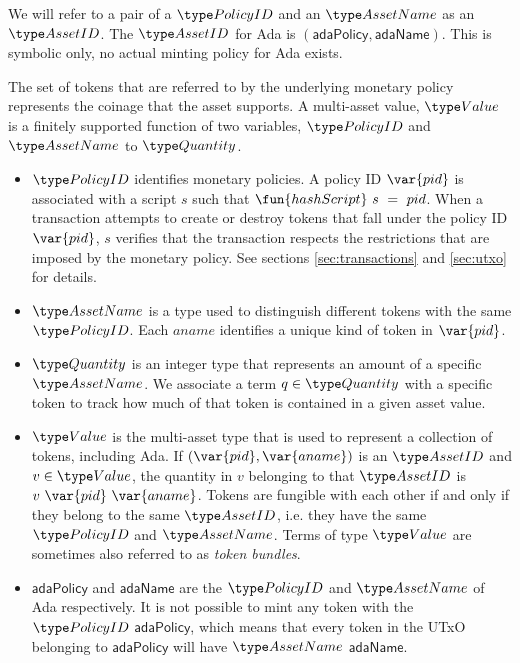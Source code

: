 We will refer to a pair of a $\PolicyID$ and an
$\AssetName$ as an $\AssetID$. The $\AssetID$ for Ada is $(\mathsf{adaPolicy}, \mathsf{adaName})$.
This is symbolic only, no actual minting policy for Ada exists.

The set of tokens that are referred to by the underlying monetary
policy represents the coinage that the asset supports. A multi-asset
value, $\Value$ is a finitely supported function of two variables,
$\PolicyID$ and $\AssetName$ to $\Quantity$.

\begin{itemize}
  \item $\PolicyID$ identifies monetary policies. A policy ID $\var{pid}$ is associated with a script
    $s$ such that $\fun{hashScript}~s~=~pid$. When a transaction attempts to create or destroy tokens
    that fall under the policy ID $\var{pid}$,
    $s$ verifies that the transaction
    respects the restrictions that are imposed by the monetary policy.
    See sections \ref{sec:transactions} and \ref{sec:utxo} for details.

  \item $\AssetName$ is a type used to distinguish different tokens with the same $\PolicyID$.
    Each $aname$ identifies a unique kind of token in $\var{pid}$.

  \item $\Quantity$ is an integer type that represents an amount of a specific $\AssetName$. We associate
    a term $q\in\Quantity$ with a specific token to track how much of that token is contained in a given asset value.

  \item $\Value$ is the multi-asset type that is used to represent
    a collection of tokens, including Ada. If $(\var{pid}, \var{aname})$ is an $\AssetID$ and $v \in \Value$,
    the quantity in $v$ belonging to that $\AssetID$ is $v~\var{pid}~\var{aname}$.
    Tokens are fungible with each other if and only if they belong to the same $\AssetID$,
    i.e. they have the same $\PolicyID$ and $\AssetName$. Terms of type $\Value$ are sometimes also referred to as
    \emph{token bundles}.

  \item $\mathsf{adaPolicy}$ and $\mathsf{adaName}$ are the $\PolicyID$ and $\AssetName$ of Ada respectively.
    It is not possible to mint any token with the $\PolicyID$ $\mathsf{adaPolicy}$, which means that every
    token in the UTxO belonging to $\mathsf{adaPolicy}$ will have $\AssetName$ $\mathsf{adaName}$.


\end{itemize}
